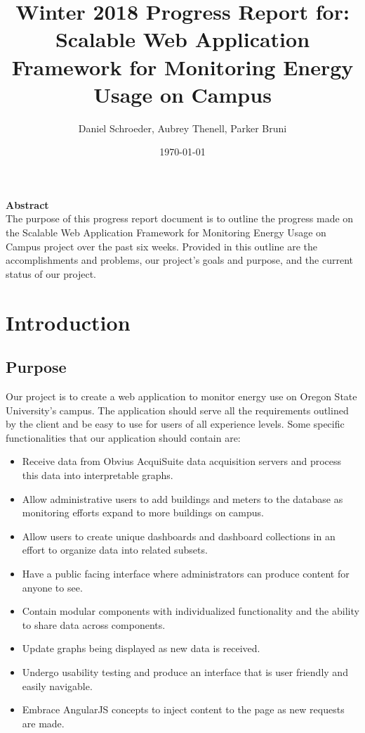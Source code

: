 \documentclass[letterpaper,10pt,serif,draftclsnofoot,onecolumn,compsoc,titlepage]{IEEEtran}
\title{Winter 2018 Progress Report for: \linebreak Scalable Web Application Framework for Monitoring Energy Usage on Campus}
\author{Daniel Schroeder, Aubrey Thenell, Parker Bruni}
\date{\today}
\begin{document}
 \maketitle
 \vspace{2cm}
 \begin{center}
 \noindent \textbf{Abstract} \\
			 \indent The purpose of this progress report document is to outline the progress made on the Scalable Web Application
Framework for Monitoring Energy Usage on Campus project over the past six weeks. Provided in this outline
are the accomplishments and problems, our project's goals and
purpose, and the current status of our project.
 \end{center}         
 
 \newpage
\tableofcontents
\newpage

\section{Introduction}
\subsection{Purpose} 
    Our project is to create a web application to monitor energy use on Oregon State University's campus. The application should serve all the requirements outlined by the client and be easy to use for users of all experience levels.
    \noindent Some specific functionalities that our application should contain are:
    \begin{itemize}
        \item Receive data from Obvius AcquiSuite data acquisition servers and process this data into interpretable graphs.
        \item Allow administrative users to add buildings and meters to the database as monitoring efforts expand to more buildings on campus.
        \item Allow users to create unique dashboards and dashboard collections in an effort to organize data into related subsets.
        \item Have a public facing interface where administrators can produce content for anyone to see.
        \item Contain modular components with individualized functionality and the ability to share data across components.
        \item Update graphs being displayed as new data is received.
        \item Undergo usability testing and produce an interface that is user friendly and easily navigable.
        \item Embrace AngularJS concepts to inject content to the page as new requests are made.
    \end{itemize}
\end{document}
